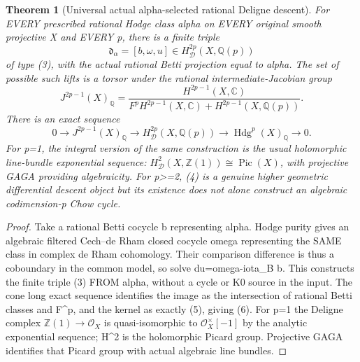 \documentclass[11pt]{article}
\newtheorem{theorem}{Theorem}[section]
\begin{document}
\begin{theorem}[Universal actual alpha-selected rational Deligne descent]
For EVERY prescribed rational Hodge class alpha on EVERY original
smooth projective X and EVERY p, there is a finite triple
\[
 \boxed{\mathfrak d_\alpha=[b,\omega,u]
  \in H^{2p}_{\mathcal D}(X,\mathbb Q(p))}
                                                               \tag{4}
\]
of type (3), with the actual rational Betti projection
equal to alpha. The set of possible such lifts is a torsor
under the rational intermediate-Jacobian group
\[
 \boxed{
 J^{2p-1}(X)_\mathbb Q=
 \frac{H^{2p-1}(X,\mathbb C)}
 {F^p H^{2p-1}(X,\mathbb C)+
                       H^{2p-1}(X,\mathbb Q(p))}.
 }                                                       \tag{5}
\]
There is an exact sequence
\[
 \boxed{
 0\longrightarrow J^{2p-1}(X)_\mathbb Q
 \longrightarrow H^{2p}_{\mathcal D}(X,\mathbb Q(p))
 \longrightarrow\operatorname{Hdg}^p(X)_\mathbb Q
 \longrightarrow0 .
 }                                                       \tag{6}
\]
For p=1, the integral version of the same construction is
the usual holomorphic line-bundle exponential sequence:
$H^2_{\mathcal D}(X,\mathbb Z(1))\cong\operatorname{Pic}(X)$,
with projective GAGA providing algebraicity.
For p>=2, (4) is a genuine higher geometric differential
descent object but its existence does not alone construct
an algebraic codimension-p Chow cycle.
\end{theorem}
\begin{proof}
Take a rational Betti cocycle b representing alpha.
Hodge purity gives an algebraic filtered Cech--de Rham
closed cocycle omega representing the SAME class in complex
de Rham cohomology. Their comparison difference is thus
a coboundary in the common model, so solve du=omega-iota_B b.
This constructs the finite triple (3) FROM alpha, without
a cycle or K0 source in the input.
The cone long exact sequence identifies the image as
the intersection of rational Betti classes and F^p,
and the kernel as exactly (5), giving (6).
For p=1 the Deligne complex
$\mathbb Z(1)\to\mathcal O_X$ is quasi-isomorphic
to $\mathcal O_X^\times[-1]$ by the analytic exponential
sequence; H^2 is the holomorphic Picard group.
Projective GAGA identifies that Picard group
with actual algebraic line bundles.
\end{proof}
\end{document}
